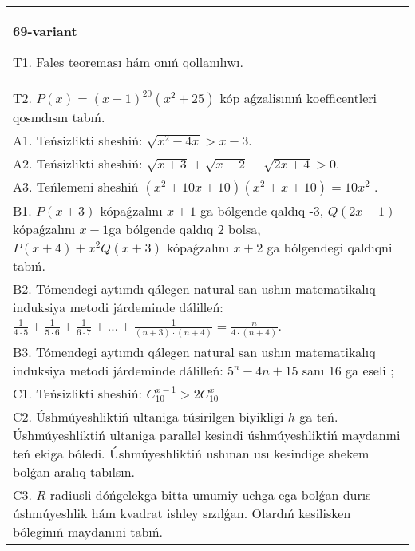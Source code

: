 \documentclass{article}
\begin{document}
\begin{tabular}{m{17cm}}
\textbf{69-variant}
\newline

T1. Fales teoreması hám onıń qollanılıwı. \\
T2. \(P(x) = (x - 1)^{20}\left( x^{2} + 25 \right)\) kóp aǵzalisınıń koefficentleri qosındısın tabıń. \\
A1. Teńsizlikti sheshiń: \(\sqrt{x^{2} - 4x} > x - 3\). \\
A2. Teńsizlikti sheshiń: \(\sqrt{x + 3} + \sqrt{x - 2} - \sqrt{2x + 4} > 0\). \\
A3. Teńlemeni sheshiń \(\left( x^{2} + 10x + 10 \right)\left( x^{2} + x + 10 \right) = 10x^{2}\) . \\
B1. \(P(x + 3)\) kópaǵzalını \(x + 1\) ga bólgende qaldıq -3, \(Q(2x - 1)\) kópaǵzalını \(x - 1\)ga bólgende qaldıq 2 bolsa, \(P(x + 4) + x^{2}Q(x + 3)\) kópaǵzalını \(x + 2\) ga bólgendegi qaldıqni tabıń. \\
B2. Tómendegi aytımdı qálegen natural san ushın matematikalıq induksiya metodi járdeminde dálilleń: \(\frac{1}{4 \cdot 5} + \frac{1}{5 \cdot 6} + \frac{1}{6 \cdot 7} + \ldots + \frac{1}{(n + 3) \cdot (n + 4)} = \frac{n}{4 \cdot (n + 4)}\). \\
B3. Tómendegi aytımdı qálegen natural san ushın matematikalıq induksiya metodi járdeminde dálilleń: \(5^{n} - 4n + 15\) sanı 16 ga eseli ; \\
C1. Teńsizlikti sheshiń: \(C_{10}^{x - 1} > 2C_{10}^{x}\) \\
C2. Úshmúyeshliktiń ultaniga túsirilgen biyikligi \(h\) ga teń. Úshmúyeshliktiń ultaniga parallel kesindi úshmúyeshliktiń maydanıni teń ekiga bóledi. Úshmúyeshliktiń ushınan usı kesindige shekem bolǵan aralıq tabılsın. \\
C3. \(R\) radiusli dóńgelekga bitta umumiy uchga ega bolǵan durıs úshmúyeshlik hám kvadrat ishley sızılǵan. Olardıń kesilisken bóleginıń maydanıni tabıń. \\

\end{tabular}
\vspace{1cm}
\end{document}
